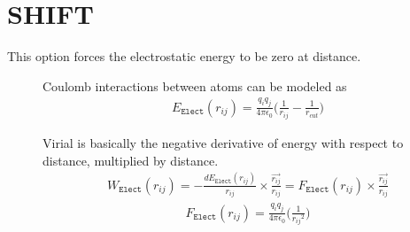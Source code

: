 \documentclass[letterpaper,10pt,english]{sphinxmanual}
\begin{document}
\section{SHIFT}
\label{\detokenize{electrostatic:shift}}
\sphinxAtStartPar
This option forces the electrostatic energy to be zero at  distance.
\begin{description}
\item[{}] \leavevmode
\sphinxAtStartPar
Coulomb interactions between atoms can be modeled as
\begin{equation*}
\begin{split}E_{\texttt{Elect}}(r_{ij}) = \frac{q_i q_j}{4\pi \epsilon_0} \Big( \frac{1}{r_{ij}} - \frac{1}{r_{cut}} \Big)\end{split}
\end{equation*}
\item[{}] \leavevmode
\sphinxAtStartPar
Virial is basically the negative derivative of energy with respect to distance, multiplied by distance.
\begin{equation*}
\begin{split}W_{\texttt{Elect}}(r_{ij}) = -\frac{dE_{\texttt{Elect}}(r_{ij})}{r_{ij}}\times \frac{\overrightarrow{r_{ij}}}{{r_{ij}}} = F_{\texttt{Elect}}(r_{ij}) \times \frac{\overrightarrow{r_{ij}}}{{r_{ij}}}\end{split}
\end{equation*}\begin{equation*}
\begin{split}F_{\texttt{Elect}}(r_{ij}) = \frac{q_i q_j}{4\pi \epsilon_0} \Big( \frac{1}{{r_{ij}}^2} \Big)\end{split}
\end{equation*}
\end{description}
\end{document}
